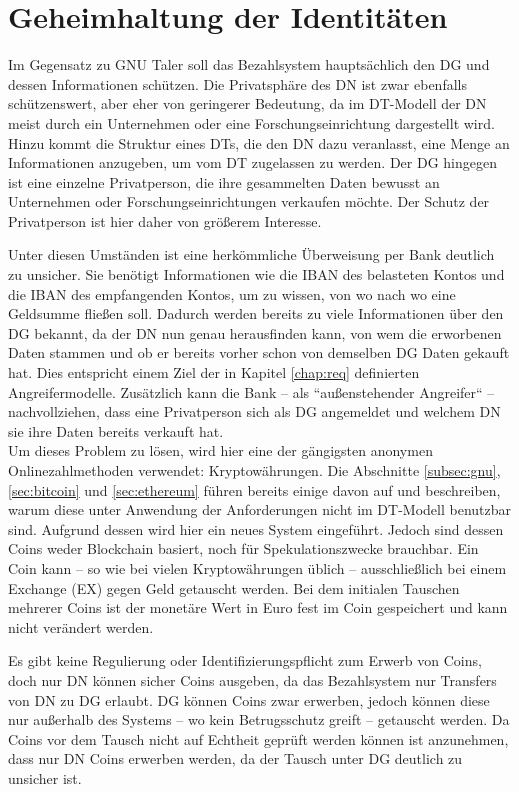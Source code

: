 \documentclass[
	fontsize=11pt,
	headings=small,
	parskip=half,           %
	bibliography=totoc,
	numbers=noenddot,       %
	open=any,               %
]{scrreprt}
\begin{document}
\section{Geheimhaltung der Identitäten}
Im Gegensatz zu GNU Taler soll das Bezahlsystem hauptsächlich den DG und dessen Informationen schützen. Die Privatsphäre des DN ist zwar ebenfalls schützenswert, aber eher von geringerer Bedeutung, da im DT-Modell der DN meist durch ein Unternehmen oder eine Forschungseinrichtung dargestellt wird. Hinzu kommt die Struktur eines DTs, die den DN dazu veranlasst, eine Menge an Informationen anzugeben, um vom DT zugelassen zu werden. Der DG hingegen ist eine einzelne Privatperson, die ihre gesammelten Daten bewusst an Unternehmen oder Forschungseinrichtungen verkaufen möchte. Der Schutz der Privatperson ist hier daher von größerem Interesse. 

Unter diesen Umständen ist eine herkömmliche Überweisung per Bank deutlich zu unsicher. Sie benötigt Informationen wie die IBAN des belasteten Kontos und die IBAN des empfangenden Kontos, um zu wissen, von wo nach wo eine Geldsumme fließen soll. Dadurch werden bereits zu viele Informationen über den DG bekannt, da der DN nun genau herausfinden kann, von wem die erworbenen Daten stammen und ob er bereits vorher schon von demselben DG Daten gekauft hat. Dies entspricht einem Ziel der in Kapitel \ref{chap:req} definierten Angreifermodelle. Zusätzlich kann die Bank -- als ``außenstehender Angreifer`` -- nachvollziehen, dass eine Privatperson sich als DG angemeldet und welchem DN sie ihre Daten bereits verkauft hat.\\
Um dieses Problem zu lösen, wird hier eine der gängigsten anonymen Onlinezahlmethoden verwendet: Kryptowährungen. Die Abschnitte \ref{subsec:gnu}, \ref{sec:bitcoin} und \ref{sec:ethereum} führen bereits einige davon auf und beschreiben, warum diese unter Anwendung der Anforderungen nicht im DT-Modell benutzbar sind. Aufgrund dessen wird hier ein neues System eingeführt. Jedoch sind dessen Coins weder Blockchain basiert, noch für Spekulationszwecke brauchbar. Ein Coin kann -- so wie bei vielen Kryptowährungen üblich -- ausschließlich bei einem Exchange (EX) gegen Geld getauscht werden. Bei dem initialen Tauschen mehrerer Coins ist der monetäre Wert in Euro fest im Coin gespeichert und kann nicht verändert werden. 

Es gibt keine Regulierung oder Identifizierungspflicht zum Erwerb von Coins, doch nur DN können sicher Coins ausgeben, da das Bezahlsystem nur Transfers von DN zu DG erlaubt. DG können Coins zwar erwerben, jedoch können diese nur außerhalb des Systems -- wo kein Betrugsschutz greift -- getauscht werden. Da Coins vor dem Tausch nicht auf Echtheit geprüft werden können ist anzunehmen, dass nur DN Coins erwerben werden, da der Tausch unter DG deutlich zu unsicher ist.
\end{document}
